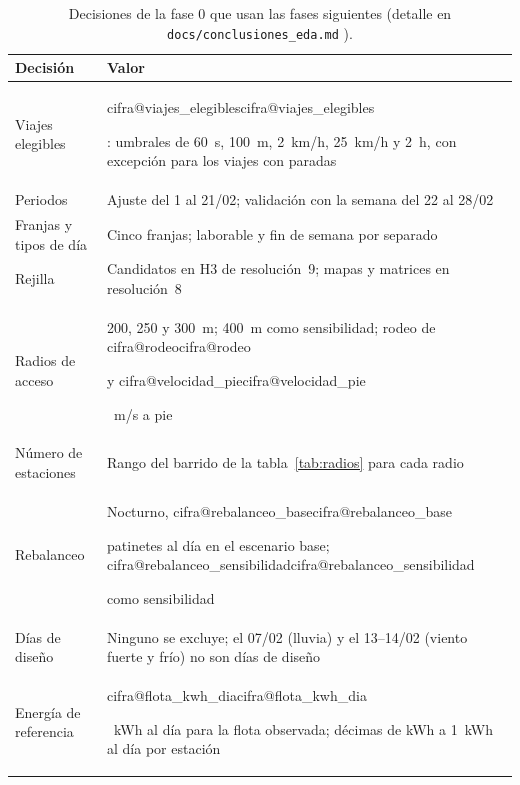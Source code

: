 \documentclass[11pt,a4paper]{article}
\makeatletter
\newcommand\cifra[1]{\ifcsname cifra@#1\endcsname\csname cifra@#1\endcsname
  \else\PackageError{memoria}{Cifra desconocida: \detokenize{#1}}{Revisa generar_cifras.py}\fi}
\makeatother
\begin{document}
\begin{table}[H]
  \centering\small
  \caption{Decisiones de la fase 0 que usan las fases siguientes (detalle en \texttt{docs/conclusiones\_eda.md} \cite{codigo}).}\label{tab:decisiones}
  \begin{tabularx}{\textwidth}{@{}lY@{}}
    \toprule
    Decisión & Valor \\
    \midrule
    Viajes elegibles & \cifra{viajes_elegibles}: umbrales de 60~s, 100~m, 2~km/h, 25~km/h y 2~h, con excepción para los viajes con paradas \\
    Periodos & Ajuste del 1 al 21/02; validación con la semana del 22 al 28/02 \\
    Franjas y tipos de día & Cinco franjas; laborable y fin de semana por separado \\
    Rejilla & Candidatos en H3 de resolución~9; mapas y matrices en resolución~8 \\
    Radios de acceso & 200, 250 y 300~m; 400~m como sensibilidad; rodeo de \cifra{rodeo} y \cifra{velocidad_pie}~m/s a pie \\
    Número de estaciones & Rango del barrido de la tabla~\ref{tab:radios} para cada radio \\
    Rebalanceo & Nocturno, \cifra{rebalanceo_base} patinetes al día en el escenario base; \cifra{rebalanceo_sensibilidad} como sensibilidad \\
    Días de diseño & Ninguno se excluye; el 07/02 (lluvia) y el 13--14/02 (viento fuerte y frío) no son días de diseño \\
    Energía de referencia & \cifra{flota_kwh_dia}~kWh al día para la flota observada; décimas de kWh a 1~kWh al día por estación \\
    \bottomrule
  \end{tabularx}
\end{table}

\end{document}
